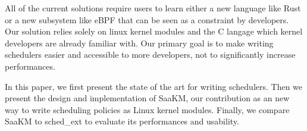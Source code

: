 \par All of the current solutions require users to learn either a new language like Rust or a new subsystem like eBPF that can be seen as a constraint by developers. Our solution relies solely on linux kernel modules and the C langage which kernel developers are already familiar with. Our primary goal is to make writing schedulers easier and accessible to more developers, not to significantly increase performances.\newline

\par In this paper, we first present the state of the art for writing schedulers. Then we present the design and implementation of SaaKM, our contribution as an new way to write scheduling policies as Linux kernel modules. Finally, we compare SaaKM to sched\_ext to evaluate its performances and usability.\newline


